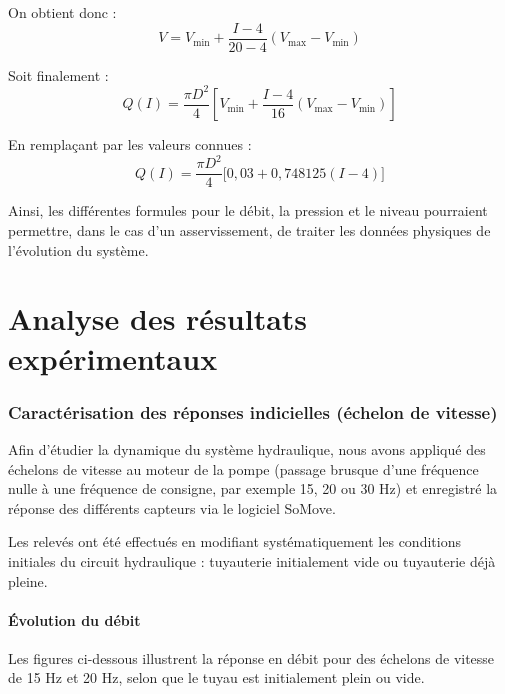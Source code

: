 \documentclass[12pt,a4paper]{article}
\begin{document}
On obtient donc :
\begin{equation*}
    \boxed{V = V_{\mathrm{min}} + \frac{I - 4}{20 - 4}(V_{\mathrm{max}} - V_{\mathrm{min}})}
\end{equation*}

Soit finalement :
\begin{equation*}
    \boxed{Q(I) = \frac{\pi D^2}{4} \left[ V_{\mathrm{min}} + \frac{I - 4}{16}(V_{\mathrm{max}} - V_{\mathrm{min}}) \right]}
\end{equation*}

En remplaçant par les valeurs connues :
\begin{equation*}
    \boxed{Q(I) = \frac{\pi D^2}{4} \big[ 0,03 + 0,748125(I - 4) \big]}
\end{equation*}

Ainsi, les différentes formules pour le débit, la pression et le niveau pourraient permettre, dans le cas d’un asservissement, de traiter les données physiques de l’évolution du système.

\clearpage

\part{Analyse des résultats expérimentaux}

\section{Caractérisation des réponses indicielles (échelon de vitesse)}

Afin d'étudier la dynamique du système hydraulique, nous avons appliqué des échelons de vitesse au moteur de la pompe (passage brusque d'une fréquence nulle à une fréquence de consigne, par exemple 15, 20 ou 30 Hz) et enregistré la réponse des différents capteurs via le logiciel SoMove.

Les relevés ont été effectués en modifiant systématiquement les conditions initiales du circuit hydraulique : tuyauterie initialement vide ou tuyauterie déjà pleine. 

\subsection{Évolution du débit}

Les figures ci-dessous illustrent la réponse en débit pour des échelons de vitesse de 15 Hz et 20 Hz, selon que le tuyau est initialement plein ou vide.
\end{document}
